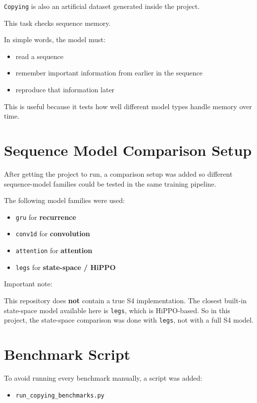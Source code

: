 \documentclass[12pt]{article}
\begin{document}
\texttt{Copying} is also an artificial dataset generated inside the project.

This task checks sequence memory.

In simple words, the model must:

\begin{itemize}
    \item read a sequence
    \item remember important information from earlier in the sequence
    \item reproduce that information later
\end{itemize}

This is useful because it tests how well different model types handle memory over time.

\section*{Sequence Model Comparison Setup}

After getting the project to run, a comparison setup was added so different sequence-model families could be tested in the same training pipeline.

The following model families were used:

\begin{itemize}
    \item \texttt{gru} for \textbf{recurrence}
    \item \texttt{conv1d} for \textbf{convolution}
    \item \texttt{attention} for \textbf{attention}
    \item \texttt{legs} for \textbf{state-space / HiPPO}
\end{itemize}

Important note:

This repository does \textbf{not} contain a true S4 implementation. The closest built-in state-space model available here is \texttt{legs}, which is HiPPO-based. So in this project, the state-space comparison was done with \texttt{legs}, not with a full S4 model.

\section*{Benchmark Script}

To avoid running every benchmark manually, a script was added:

\begin{itemize}
    \item \texttt{run\_copying\_benchmarks.py}
\end{itemize}
\end{document}
